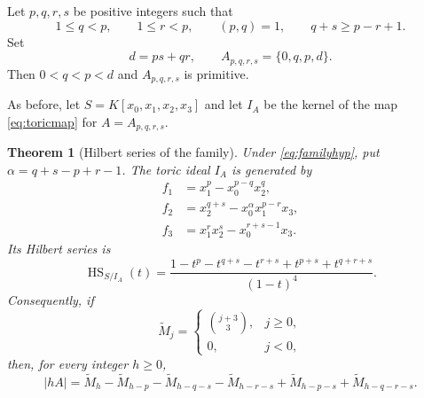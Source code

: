 \documentclass[11pt,reqno]{amsart}
\newtheorem{theorem}{Theorem}[section]
\theoremstyle{definition}
\theoremstyle{remark}
\newcommand{\HS}{\operatorname{HS}}
\begin{document}
Let $p,q,r,s$ be positive integers such that
\begin{equation}\label{eq:familyhyp}
 1\leq q<p,\qquad 1\leq r<p,
 \qquad (p,q)=1,
 \qquad q+s\geq p-r+1.
\end{equation}
Set
\begin{equation}\label{eq:familyA}
 d=ps+qr,
 \qquad
 A_{p,q,r,s}=\{0,q,p,d\}.
\end{equation}
Then $0<q<p<d$ and $A_{p,q,r,s}$ is primitive.

As before, let $S=K[x_0,x_1,x_2,x_3]$ and let $I_A$ be the kernel of the
map \eqref{eq:toricmap} for $A=A_{p,q,r,s}$.

\begin{theorem}[Hilbert series of the family]\label{thm:family}
Under \eqref{eq:familyhyp}, put $\alpha=q+s-p+r-1$.  The toric ideal $I_A$
is generated by
\begin{align}
 f_1&=x_1^p-x_0^{p-q}x_2^q,\label{eq:f1}\\
 f_2&=x_2^{q+s}-x_0^\alpha x_1^{p-r}x_3,\label{eq:f2}\\
 f_3&=x_1^r x_2^s-x_0^{r+s-1}x_3.\label{eq:f3}
\end{align}
Its Hilbert series is
\begin{equation}\label{eq:HSfamily}
 \HS_{S/I_A}(t)=
 \frac{1-t^p-t^{q+s}-t^{r+s}+t^{p+s}+t^{q+r+s}}
 {(1-t)^4}.
\end{equation}
Consequently, if
\[
 \widetilde M_j=\begin{cases}
 \binom{j+3}{3},&j\geq0,\\
 0,&j<0,
 \end{cases}
\]
then, for every integer $h\geq0$,
\begin{equation}\label{eq:Hfamily}
 |hA|=\widetilde M_h-\widetilde M_{h-p}
 -\widetilde M_{h-q-s}-\widetilde M_{h-r-s}
 +\widetilde M_{h-p-s}+\widetilde M_{h-q-r-s}.
\end{equation}
\end{theorem}
\end{document}
